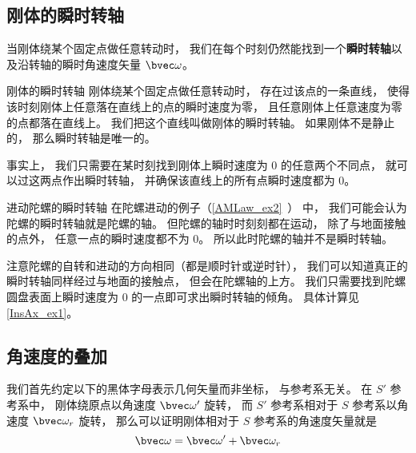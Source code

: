 


\subsection{刚体的瞬时转轴}
当刚体绕某个固定点做任意转动时， 我们在每个时刻仍然能找到一个\textbf{瞬时转轴}以及沿转轴的瞬时角速度矢量 $\bvec \omega$。

\begin{theorem}{刚体的瞬时转轴}
刚体绕某个固定点做任意转动时， 存在过该点的一条直线， 使得该时刻刚体上任意落在直线上的点的瞬时速度为零， 且任意刚体上任意速度为零的点都落在直线上。 我们把这个直线叫做刚体的瞬时转轴。 如果刚体不是静止的， 那么瞬时转轴是唯一的。
\end{theorem}
事实上， 我们只需要在某时刻找到刚体上瞬时速度为 0 的任意两个不同点， 就可以过这两点作出瞬时转轴， 并确保该直线上的所有点瞬时速度都为 0。

\begin{example}{进动陀螺的瞬时转轴}\label{InsAx_ex2}
在陀螺进动的例子（\autoref{AMLaw_ex2}~） 中， 我们可能会认为陀螺的瞬时转轴就是陀螺的轴。 但陀螺的轴时时刻刻都在运动， 除了与地面接触的点外， 任意一点的瞬时速度都不为 0。 所以此时陀螺的轴并不是瞬时转轴。

注意陀螺的自转和进动的方向相同（都是顺时针或逆时针）， 我们可以知道真正的瞬时转轴同样经过与地面的接触点， 但会在陀螺轴的上方。 我们只需要找到陀螺圆盘表面上瞬时速度为 0 的一点即可求出瞬时转轴的倾角。 具体计算见\autoref{InsAx_ex1}。
\end{example}

\subsection{角速度的叠加}

我们首先约定以下的黑体字母表示几何矢量而非坐标， 与参考系无关。 在 $S'$ 参考系中， 刚体绕原点以角速度 $\bvec \omega'$ 旋转， 而 $S'$ 参考系相对于 $S$ 参考系以角速度 $\bvec \omega_r$ 旋转， 那么可以证明刚体相对于 $S$ 参考系的角速度矢量就是
\begin{equation}\label{InsAx_eq1}
\bvec \omega = \bvec \omega' + \bvec \omega_r
\end{equation}

